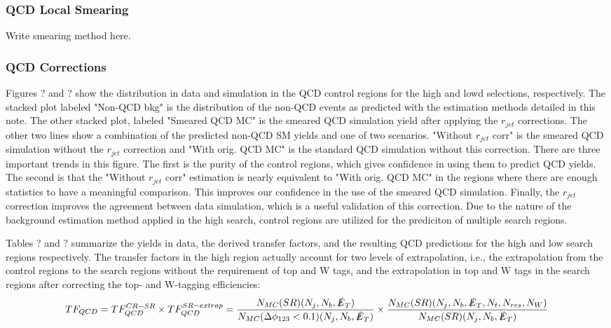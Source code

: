 \subsubsection{QCD Local Smearing}\label{Smearing}

Write smearing method here.

\subsubsection{QCD Corrections}

Figures ? and ? show the \met{} distribution in data and simulation in the QCD control regions for the high \dm{} and lowd \dm{} selections, respectively. The stacked plot labeled "Non-QCD bkg" is the distribution of the non-QCD events as predicted with the estimation methods detailed in this note. The other stacked plot, labeled "Smeared QCD MC" is the smeared QCD simulation yield after applying the $r_{jet}$ corrections. The other two lines show a combination of the predicted non-QCD SM yields and one of two scenarios. "Without $r_{jet}$ corr" is the smeared QCD simulation without the $r_{jet}$ correction and "With orig. QCD MC" is the standard QCD simulation without this correction. There are three important trends in this figure. The first is the purity of the control regions, which gives confidence in using them to predict QCD yields. The second is that the "Without $r_{jet}$ corr" estimation is nearly equivalent to "With orig. QCD MC" in the regions where there are enough statistics to have a meaningful comparison. This improves our confidence in the use of the smeared QCD simulation. Finally, the $r_{jet}$ correction improves the agreement between data simulation, which is a useful validation of this correction. Due to the nature of the background estimation method applied in the high \dm{} search, control regions are utilized for the prediciton of multiple search regions. 

Tables ? and ? summarize the yields in data, the derived transfer factors, and the resulting QCD predictions for the high \dm{} and low \dm{} search regions respectively. The transfer factors in the high \dm{} region actually account for two levels of extrapolation, i.e., the extrapolation from the control regions to the search regions without the requirement of top and W tags, and the extrapolation in top and W tags in the search regions after correcting the top- and W-tagging efficiencies:
\begin{equation}
TF_{QCD}=TF_{QCD}^{CR-SR}\times TF_{QCD}^{SR-extrap}=\frac{N_{MC}(SR)(N_j,N_b,\slashed{E}_{T})}{N_{MC}(\Delta\phi_{123}<0.1)(N_j,N_b,\slashed{E}_{T})}\times\frac{N_{MC}(SR)(N_j,N_b,\slashed{E}_{T},N_t,N_{res},N_W)}{N_{MC}(SR)(N_j,N_b,\slashed{E}_{T})}
\end{equation}

